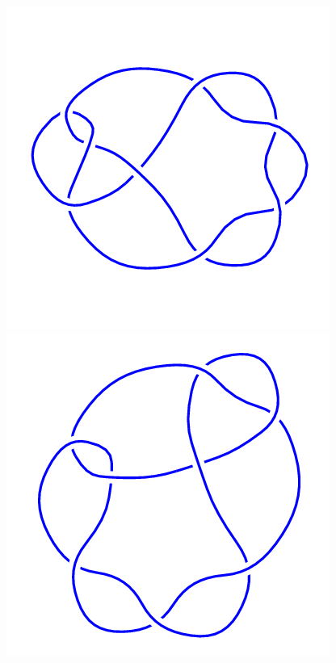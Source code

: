\begin{figure}[H]
	\begin{minipage}[b]{.18\linewidth}
		\centering
		\includegraphics[width=\linewidth]{../data/8_7.png}
	\end{minipage}
	\begin{minipage}[b]{.18\linewidth}
		\centering
		\includegraphics[width=\linewidth]{../data/8_8.png}

\end{minipage}
\end{figure}
